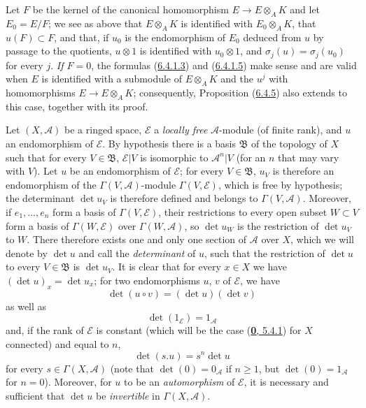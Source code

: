 \begin{remark}[6.4.7]
Let $F$ be the kernel of the canonical homomorphism $E\to E\otimes_AK$ and
let $E_0=E/F$; we see as above that $E\otimes_AK$ is identified with
$E_0\otimes_AK$, that $u(F)\subset F$, and that, if $u_0$ is the
endomorphism of $E_0$ deduced from $u$ by passage to the quotients,
$u\otimes1$ is identified with $u_0\otimes1$, and
$\sigma_j(u)=\sigma_j(u_0)$ for every $j$. \emph{If $F=0$}, the formulas
(\hyperref[II.6.4.1.3]{6.4.1.3}) and
(\hyperref[II.6.4.1.5]{6.4.1.5}) make sense and are valid when $E$ is
identified with a submodule of $E\otimes_AK$ and the $u^j$ with
homomorphisms $E\to E\otimes_AK$; consequently, Proposition
(\hyperref[II.6.4.5]{6.4.5}) also extends to this case, together with its
proof.
\end{remark}

\begin{env}[6.4.8]
\label{II.6.4.8}
Let $(X,\mathcal{A})$ be a ringed space, $\mathcal{E}$ a \emph{locally free}
$\mathcal{A}$-module (of finite rank), and $u$ an endomorphism of
$\mathcal{E}$. By hypothesis there is a basis $\mathfrak{B}$ of the topology
of $X$ such that for every $V\in\mathfrak{B}$, $\mathcal{E}|V$ is isomorphic
to $\mathcal{A}^n|V$ (for an $n$ that may vary with $V$). Let $u$ be an
endomorphism of $\mathcal{E}$; for every $V\in\mathfrak{B}$, $u_V$ is
therefore an endomorphism of the $\Gamma(V,\mathcal{A})$-module
$\Gamma(V,\mathcal{E})$, which is free by hypothesis; the determinant
$\det u_V$ is therefore defined and belongs to $\Gamma(V,\mathcal{A})$.
Moreover, if $e_1,\ldots,e_n$ form a basis of $\Gamma(V,\mathcal{E})$, their
restrictions to every open subset $W\subset V$ form a basis of
$\Gamma(W,\mathcal{E})$ over $\Gamma(W,\mathcal{A})$, so $\det u_W$ is the
restriction of $\det u_V$ to $W$. There therefore exists one and only one
section of $\mathcal{A}$ over $X$, which we will denote by $\det u$ and call
the \emph{determinant} of $u$, such that the restriction of $\det u$ to every
$V\in\mathfrak{B}$ is $\det u_V$. It is clear that for every $x\in X$ we have
$(\det u)_x=\det u_x$; for two endomorphisms $u$, $v$ of $\mathcal{E}$, we
have
\[
\label{II.6.4.8.1}
\det(u\circ v)=(\det u)(\det v)
\tag{6.4.8.1}
\]
as well as
\[
\label{II.6.4.8.2}
\det(1_{\mathcal{E}})=1_{\mathcal{A}}
\tag{6.4.8.2}
\]
and, if the rank of $\mathcal{E}$ is constant (which will be the case
(\hyperref[0.5.4.1]{\textbf{0}, 5.4.1}) for $X$ connected) and equal to $n$,
\[
\label{II.6.4.8.3}
\det(s.u)=s^n\det u
\tag{6.4.8.3}
\]
for every $s\in\Gamma(X,\mathcal{A})$ (note that $\det(0)=0_{\mathcal{A}}$
if $n\geq1$, but $\det(0)=1_{\mathcal{A}}$ for $n=0$). Moreover, for $u$ to
be an \emph{automorphism} of $\mathcal{E}$, it is necessary and sufficient
that $\det u$ be \emph{invertible} in $\Gamma(X,\mathcal{A})$.


\end{env}
